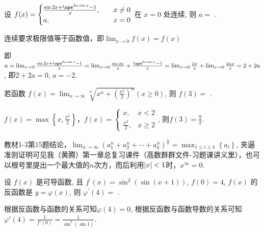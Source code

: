 \documentclass{USTBExam}
\begin{document}
\begin{problem}
  设 $f(x)=
    \begin{cases}
      \frac{\sin 2 x+\upe^{2 a \sin x}-1}{x}, & \quad x \neq 0 \\
      a,                                      & \quad x=0
    \end{cases}
  $ 在 $x=0$ 处连续, 则 $a=$
  \fillin[$-2$].
\end{problem}

\begin{analysis}
  连续要求极限值等于函数值，即$\lim _{x \to 0} f(x) = f(x)$

  即$a = \lim _{x \to 0} \frac{\sin 2 x+\upe^{2 a \sin x}-1}{x} = \lim _{x \to 0} \frac{\sin 2 x}{x} + \frac{\upe^{2 a \sin x}-1}{x} = \lim _{x \to 0} \frac{2x}{x} + \lim _{x \to 0} \frac{2 a x}{x} = 2+2a$, 即$2+2a=0$, $a=-2$.
\end{analysis}

\begin{problem}
  若函数 $f(x)=\lim _{n \to \infty} \sqrt[n]{x^{n}+\left(\frac{x^{2}}{2}\right)^{n}}(x \geq 0)$, 则 $f(3)=$
  \fillin[$\frac{9}{2}$].
\end{problem}

\begin{analysis}
  $f(x)=\max\left\{ x, \frac{x^2}{2} \right\}$，$f(x) =
    \begin{cases}
      x, & x<2 \\ \frac{x^2}{2}, & x \ge 2
    \end{cases}
  $, 则$f(3) = \frac{9}{2}$.

  \faMortarBoard 教材1-3第15题结论，$\lim_{n\to \infty} \left( a_{1}^{n}+a_{2}^{n}+\cdots +a_{k}^{n} \right) ^{\tfrac{1}{n}}=\max_{1\leqslant i\leqslant k} \left\{ a_i \right\}$, 夹逼准则证明可见我（黄腾）第一章总复习课件（高数群群文件-习题课讲义里），也可以根号里提出一个最大值的$n$次方，而后利用$\left| x \right|<1$时，$x^\infty=0$.
\end{analysis}

\begin{problem}
  设 $f(x)$ 是可导函数, 且 $f^{\prime}(x)=\sin ^{2}(\sin (x+1))$, $f(0)=4$, $f(x)$ 的反函数是 $y=\varphi(x)$, 则 $\varphi^{\prime}(4)=$
  .
\end{problem}

\begin{analysis}
  根据反函数与函数的关系可知$\varphi(4) = 0$, 根据反函数与函数导数的关系可知$\varphi'(4) = \frac{1}{f'(0)} = \frac{1}{\sin^2 (\sin 1)}$.
\end{analysis}
\end{document}

